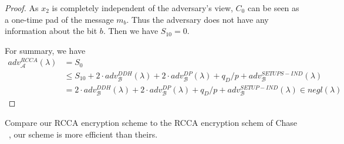 \begin{proof}
  As $x_2$ is completely independent of the adversary's view, $C_0$ can be seen as a one-time pad of the message $m_b$. Thus the adversary does not have any information about the bit $b$. Then we have $S_{10} = 0$.

  For summary, we have
  \begin{align*}
    adv_{\mathcal{A}}^{RCCA}(\lambda) &= S_0\\
    &\leq S_{10} + 2 \cdot adv_{\mathcal{B}}^{DDH}(\lambda) + 2 \cdot adv_{\mathcal{B}}^{DP}(\lambda) + q_D/p + adv_{\mathcal{B}}^{SETUPS-IND}(\lambda)\\
    &= 2 \cdot adv_{\mathcal{B}}^{DDH}(\lambda) + 2 \cdot adv_{\mathcal{B}}^{DP}(\lambda) + q_D/p + adv_{\mathcal{B}}^{SETUP-IND}(\lambda) \in negl(\lambda)
  \end{align*}
\end{proof}


Compare our RCCA encryption scheme to the RCCA encryption schem of Chase \etal~\cite{DBLP:conf/eurocrypt/ChaseKLM12}, our scheme is more efficient than theirs.

